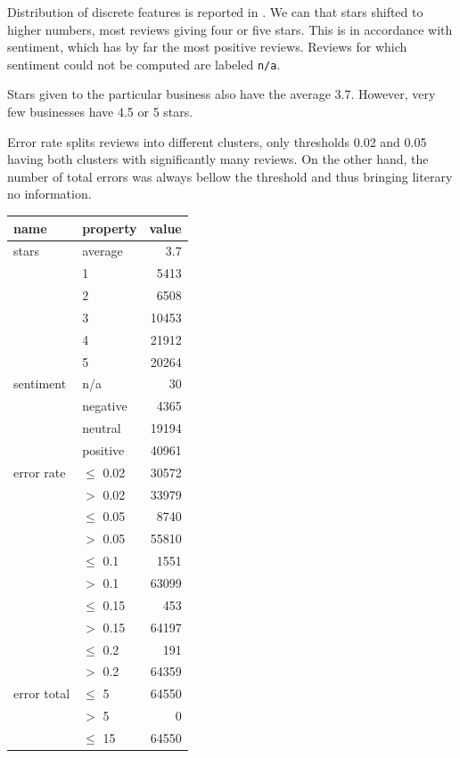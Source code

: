 Distribution of discrete features is reported in .
We can that stars shifted to higher numbers, most reviews giving
four or five stars.
This is in accordance with sentiment, which has by far the most positive reviews.
Reviews for which sentiment could not be computed are labeled \texttt{n/a}.

Stars given to the particular business also have the average 3.7.
However, very few businesses have 4.5 or 5 stars.

Error rate splits reviews into different clusters, only thresholds 0.02 and 0.05
having both clusters with significantly many reviews.
On the other hand, the number of total errors was always bellow the threshold and 
thus bringing literary no information.

\begin{table}[h!]
\centering
\begin{tabular}{llr}
\toprule
\textbf{name} & \textbf{property} & \textbf{value} \\
\midrule
stars 	& average	& 3.7 \\
		&1			& 5413 \\
		& 2			& 6508 \\
		& 3			& 10453 \\
		& 4			& 21912 \\
		& 5			& 20264 \\
\midrule
sentiment & n/a & 30 \\
&   negative & 4365 \\
&   neutral & 19194 \\
&   positive & 40961 \\
\midrule
error rate & $\le$ 0.02 & 30572 \\
		   & $>$ 0.02 & 33979 \\
\midrule
		   & $\le$ 0.05 & 8740 \\
		   & $>$ 0.05  & 55810 \\
\midrule
		   & $\le$ 0.1 & 1551 \\
		   & $>$ 0.1  & 63099 \\
\midrule
		   & $\le$ 0.15 & 453 \\
		   & $>$ 0.15  & 64197 \\
\midrule
		   & $\le$ 0.2 & 191 \\
		   & $>$ 0.2  & 64359 \\
\midrule
error total & $\le$ 5  & 64550 \\
			& $>$ 5 & 0 \\
\midrule
			& $\le$ 15  & 64550 \\ 

\end{tabular}
\end{table}
